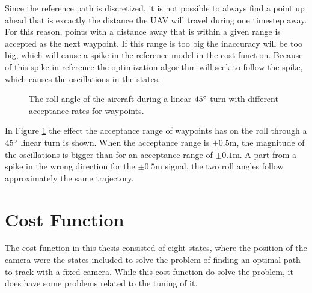 Since the reference path is discretized, it is not possible to always find a point up ahead that is excactly the distance the UAV will travel during one timestep away. For this reason, points with a distance away that is within a given range is accepted as the next waypoint. If this range is too big the inaccuracy will be too big, which will cause a spike in the reference model in the cost function. Because of this spike in reference the optimization algorithm will seek to follow the spike, which causes the oscillations in the states.

\begin{figure}[]
	\centering
	\caption{The roll angle of the aircraft during a linear $45\degree$ turn with different acceptance rates for waypoints.}
	\label{fig:oscillating_attitude}
\end{figure}

In Figure \ref{fig:oscillating_attitude} the effect the acceptance range of waypoints has on the roll through a $45\degree$ linear turn is shown. When the acceptance range is $\pm 0.5$m, the magnitude of the oscillations is bigger than for an acceptance range of $\pm 0.1$m. A part from a spike in the wrong direction for the $\pm 0.5$m signal, the two roll angles follow approximately the same trajectory.


\section{Cost Function}

The cost function in this thesis consisted of eight states, where the position of the camera were the states included to solve the problem of finding an optimal path to track with a fixed camera. While this cost function do solve the problem, it does have some problems related to the tuning of it.

